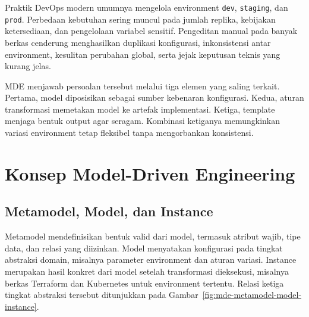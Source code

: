Praktik DevOps modern umumnya mengelola environment \texttt{dev}, \texttt{staging}, dan \texttt{prod}. Perbedaan kebutuhan sering muncul pada jumlah replika, kebijakan ketersediaan, dan pengelolaan variabel sensitif. Pengeditan manual pada banyak berkas cenderung menghasilkan duplikasi konfigurasi, inkonsistensi antar environment, kesulitan perubahan global, serta jejak keputusan teknis yang kurang jelas.

MDE menjawab persoalan tersebut melalui tiga elemen yang saling terkait. Pertama, model diposisikan sebagai sumber kebenaran konfigurasi. Kedua, aturan transformasi memetakan model ke artefak implementasi. Ketiga, template menjaga bentuk output agar seragam. Kombinasi ketiganya memungkinkan variasi environment tetap fleksibel tanpa mengorbankan konsistensi.

\section{Konsep Model-Driven Engineering}\label{sec:mde-konsep}

\subsection[Metamodel, Model, dan Instancesubsec]{Metamodel, Model, dan Instance}\label{subsec:mde-metamodel-model-instance}

Metamodel mendefinisikan bentuk valid dari model, termasuk atribut wajib, tipe data, dan relasi yang diizinkan. Model menyatakan konfigurasi pada tingkat abstraksi domain, misalnya parameter environment dan aturan variasi. Instance merupakan hasil konkret dari model setelah transformasi dieksekusi, misalnya berkas Terraform dan Kubernetes untuk environment tertentu. Relasi ketiga tingkat abstraksi tersebut ditunjukkan pada Gambar~\ref{fig:mde-metamodel-model-instance}.

